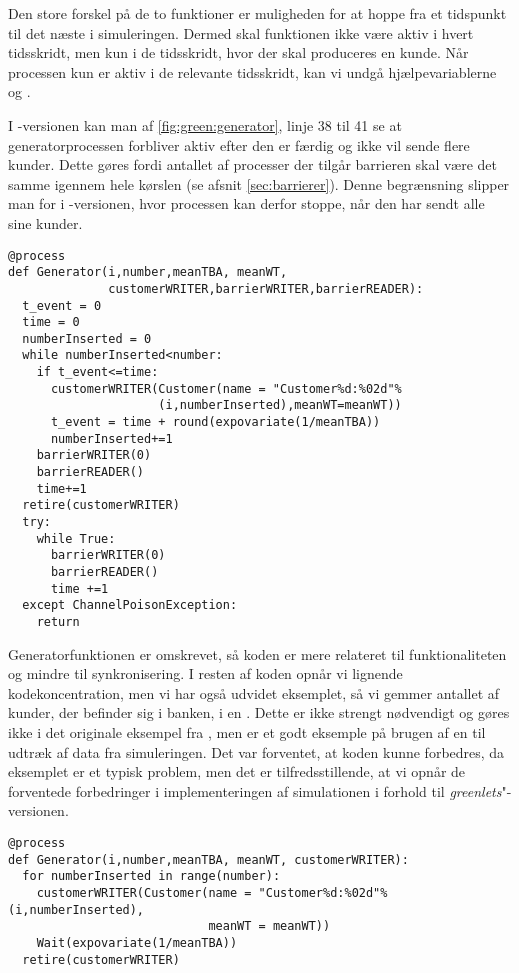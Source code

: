 Den store forskel på de to funktioner er muligheden for at hoppe fra et tidspunkt til det næste i simuleringen. Dermed skal funktionen ikke være aktiv i hvert tidsskridt, men kun i de tidsskridt, hvor der skal produceres en kunde. Når processen kun er aktiv i de relevante tidsskridt, kan vi undgå hjælpevariablerne  og . 

I  -versionen kan man af \cref{fig:green:generator}, linje 38 til 41 se at generatorprocessen forbliver aktiv efter den er færdig og ikke vil sende flere kunder. Dette gøres fordi antallet af processer der tilgår barrieren skal være det samme igennem hele kørslen (se afsnit \cref{sec:barrierer}).  Denne begrænsning slipper man for i -versionen, hvor processen kan derfor stoppe, når den har sendt alle sine kunder.

\begin{lstlisting}[firstnumber=21, label=fig:green:generator, caption=Generatorprocessen for \emph{greenlets}-versionen]
@process
def Generator(i,number,meanTBA, meanWT,
              customerWRITER,barrierWRITER,barrierREADER):
  t_event = 0
  time = 0
  numberInserted = 0
  while numberInserted<number:
    if t_event<=time:
      customerWRITER(Customer(name = "Customer%d:%02d"%
                     (i,numberInserted),meanWT=meanWT))
      t_event = time + round(expovariate(1/meanTBA))
      numberInserted+=1
    barrierWRITER(0)
    barrierREADER()
    time+=1
  retire(customerWRITER)
  try:
    while True:
      barrierWRITER(0)
      barrierREADER()
      time +=1
  except ChannelPoisonException: 
    return
\end{lstlisting}

Generatorfunktionen er omskrevet, så koden er mere relateret til funktionaliteten og mindre til synkronisering.  I resten af koden opnår vi lignende kodekoncentration, men vi har også udvidet eksemplet, så vi gemmer antallet af kunder, der befinder sig i banken, i en . Dette er ikke strengt nødvendigt og gøres ikke i det originale eksempel fra \simpy, men er et godt eksemple på brugen af en  til udtræk af data fra simuleringen. Det var forventet, at koden kunne forbedres, da eksemplet er et typisk \des problem, men det er tilfredsstillende, at vi opnår de forventede forbedringer i implementeringen af simulationen i forhold til \emph{greenlets}"-versionen.


\begin{lstlisting}[firstnumber=20, label=fig:sim:generator, caption=Generatorprocessen for \emph{simulerings}-versionen]
@process
def Generator(i,number,meanTBA, meanWT, customerWRITER):
  for numberInserted in range(number):
    customerWRITER(Customer(name = "Customer%d:%02d"%(i,numberInserted),
                            meanWT = meanWT))
    Wait(expovariate(1/meanTBA))
  retire(customerWRITER)
\end{lstlisting}

